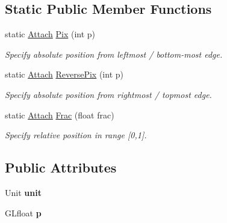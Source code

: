 \subsection*{Static Public Member Functions}
\begin{DoxyCompactItemize}
\item 
static \hyperlink{structpangolin_1_1_attach}{Attach} \hyperlink{structpangolin_1_1_attach_adb6922d8ea7e5c122eade07cdc914cfa}{Pix} (int p)\hypertarget{structpangolin_1_1_attach_adb6922d8ea7e5c122eade07cdc914cfa}{}\label{structpangolin_1_1_attach_adb6922d8ea7e5c122eade07cdc914cfa}

\begin{DoxyCompactList}\small\item\em Specify absolute position from leftmost / bottom-\/most edge. \end{DoxyCompactList}\item 
static \hyperlink{structpangolin_1_1_attach}{Attach} \hyperlink{structpangolin_1_1_attach_a613727f9ac27238b579dc867e9bad321}{Reverse\+Pix} (int p)\hypertarget{structpangolin_1_1_attach_a613727f9ac27238b579dc867e9bad321}{}\label{structpangolin_1_1_attach_a613727f9ac27238b579dc867e9bad321}

\begin{DoxyCompactList}\small\item\em Specify absolute position from rightmost / topmost edge. \end{DoxyCompactList}\item 
static \hyperlink{structpangolin_1_1_attach}{Attach} \hyperlink{structpangolin_1_1_attach_a5fc5754149790244055813eaee3d4810}{Frac} (float frac)
\begin{DoxyCompactList}\small\item\em Specify relative position in range \mbox{[}0,1\mbox{]}. \end{DoxyCompactList}\end{DoxyCompactItemize}
\subsection*{Public Attributes}
\begin{DoxyCompactItemize}
\item 
Unit {\bfseries unit}\hypertarget{structpangolin_1_1_attach_a68c6cefbde94f95407ea6c1ba632e0c1}{}\label{structpangolin_1_1_attach_a68c6cefbde94f95407ea6c1ba632e0c1}

\item 
G\+Lfloat {\bfseries p}\hypertarget{structpangolin_1_1_attach_a590a366440d7f2780f943e01a2032dc6}{}\label{structpangolin_1_1_attach_a590a366440d7f2780f943e01a2032dc6}

\end{DoxyCompactItemize}


